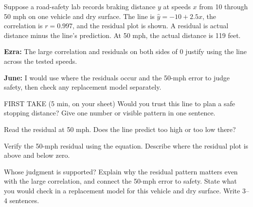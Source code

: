 \documentclass[14pt]{extarticle}
\begin{document}
\pagestyle{empty}


\noindent\begin{minipage}[t]{0.57\linewidth}
\vspace{0pt}
Suppose a road-safety lab records braking distance $y$ at speeds $x$ from 10 through 50 mph on one vehicle and dry surface. The line is $\hat y=-10+2.5x$, the correlation is $r=0.997$, and the residual plot is shown. A residual is actual distance minus the line's prediction. At 50 mph, the actual distance is 119 feet.\par\smallskip \textbf{Ezra:} The large correlation and residuals on both sides of 0 justify using the line across the tested speeds.\par \textbf{June:} I would use where the residuals occur and the 50-mph error to judge safety, then check any replacement model separately.\par
\end{minipage}\hfill
\begin{minipage}[t]{0.40\linewidth}
\vspace{0pt}
\begin{center}
\end{center}
\end{minipage}

\begin{firsttakebox}{FIRST TAKE (5 min, on your sheet)}
Would you trust this line to plan a safe stopping distance? Give one number or visible pattern in one sentence.
\end{firsttakebox}

\begin{description}[leftmargin=1.15in, labelwidth=1in, itemsep=2pt, topsep=2pt]
  \item[\dokbadge{1}~(a)] Read the residual at 50 mph. Does the line predict too high or too low there?
  \item[\dokbadge{2}~(b)] Verify the 50-mph residual using the equation. Describe where the residual plot is above and below zero.
  \item[\dokbadge{3}~(c)] Whose judgment is supported? Explain why the residual pattern matters even with the large correlation, and connect the 50-mph error to safety. State what you would check in a replacement model for this vehicle and dry surface. Write 3--4 sentences.
\end{description}
\end{document}
